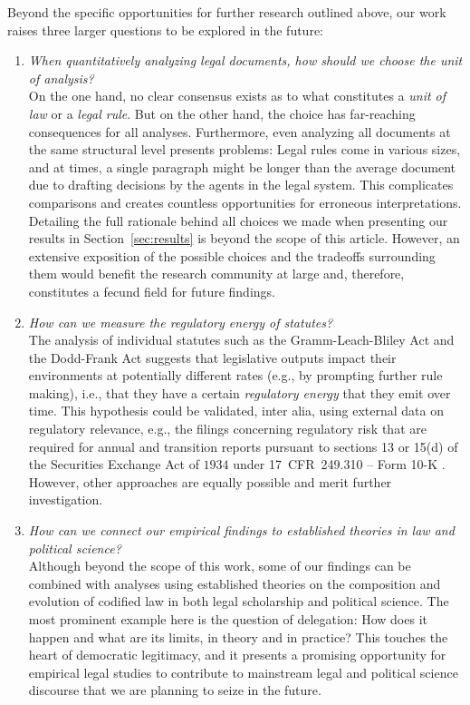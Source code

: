 Beyond the specific opportunities for further research outlined above, 
our work raises three larger questions to be explored in the future:
\begin{enumerate}
	\item \emph{When quantitatively analyzing legal documents, how should we choose the unit of analysis?}\\
	On the one hand, no clear consensus exists as to what constitutes a \emph{unit of law} or a \emph{legal rule}. 
	But on the other hand, the choice has far-reaching consequences for all analyses.
	Furthermore, even analyzing all documents at the same structural level presents problems: 
	Legal rules come in various sizes, and at times, a single paragraph might be longer than the average document due to drafting decisions by the agents in the legal system.
	This complicates comparisons and creates countless opportunities for erroneous interpretations.
	Detailing the full rationale behind all choices we made when presenting our results in Section~\ref{sec:results} is beyond the scope of this article. 
	However, an extensive exposition of the possible choices and the tradeoffs surrounding them would benefit the research community at large and, therefore, constitutes a fecund field for future findings.
	\item \emph{How can we measure the \emph{regulatory energy} of statutes?}\\
	The analysis of individual statutes such as the Gramm-Leach-Bliley Act and the Dodd-Frank Act suggests that legislative outputs impact their environments at potentially different rates (e.g., by prompting further rule making), 
	i.e., that they have a certain \emph{regulatory energy} that they emit over time. 
	This hypothesis could be validated, inter alia, using external data on regulatory relevance, e.g., the filings concerning regulatory risk that are required for annual and transition reports pursuant to sections 13 or 15(d) of the Securities Exchange Act of $1934$ under 17~CFR~249.310 -- Form 10-K \cite{bommarito2017}. 
	However, other approaches are equally possible and merit further investigation.
	\item \emph{How can we connect our empirical findings to established theories in law and political science?}\\
	Although beyond the scope of this work, some of our findings can be combined with analyses using established theories on the composition and evolution of codified law in both legal scholarship and political science.
	The most prominent example here is the question of delegation: 
	How does it happen and what are its limits, in theory and in practice?
	This touches the heart of democratic legitimacy, and it presents a promising opportunity for empirical legal studies to contribute to mainstream legal and political science discourse that we are planning to seize in the future.
\end{enumerate}
